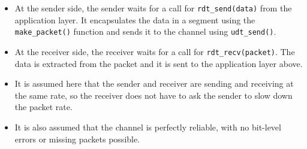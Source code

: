 \documentclass{article}
\theoremstyle{plain}
\theoremstyle{definition}
\begin{document}
\begin{itemize}
    \item At the sender side, the sender waits for a call for \texttt{rdt\_send(data)} from the application layer. It encapsulates the data in a segment using the \texttt{make\_packet()} function and sends it to the channel using \texttt{udt\_send()}.
    
    \item At the receiver side, the receiver waits for a call for \texttt{rdt\_recv(packet)}. The data is extracted from the packet and it is sent to the application layer above. 
    
    \item It is assumed here that the sender and receiver are sending and receiving at the same rate, so the receiver does not have to ask the sender to slow down the packet rate. 
    
    \item It is also assumed that the channel is perfectly reliable, with no bit-level errors or missing packets possible.
\end{itemize}
\end{document}
